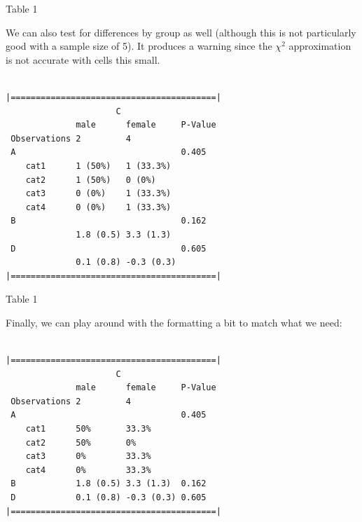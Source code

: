 \begin{frame}[fragile]{Table 1}

We can also test for differences by group as well (although this is not
particularly good with a sample size of 5). It produces a warning since
the \(\chi^2\) approximation is not accurate with cells this small.

\begin{Shaded}
\begin{Highlighting}[]
        \OperatorTok{~}
       \NormalTok{)}
\end{Highlighting}
\end{Shaded}

\begin{verbatim}

|=========================================|
                      C 
              male      female     P-Value
 Observations 2         4                 
 A                                 0.405  
    cat1      1 (50%)   1 (33.3%)         
    cat2      1 (50%)   0 (0%)            
    cat3      0 (0%)    1 (33.3%)         
    cat4      0 (0%)    1 (33.3%)         
 B                                 0.162  
              1.8 (0.5) 3.3 (1.3)         
 D                                 0.605  
              0.1 (0.8) -0.3 (0.3)        
|=========================================|
\end{verbatim}

\end{frame}

\begin{frame}[fragile]{Table 1}

Finally, we can play around with the formatting a bit to match what we
need:

\begin{Shaded}
\begin{Highlighting}[]
        \OperatorTok{~}
       \NormalTok{,}
        \NormalTok{(}\NormalTok{, }\NormalTok{))}
\end{Highlighting}
\end{Shaded}

\begin{verbatim}

|=========================================|
                      C 
              male      female     P-Value
 Observations 2         4                 
 A                                 0.405  
    cat1      50%       33.3%             
    cat2      50%       0%                
    cat3      0%        33.3%             
    cat4      0%        33.3%             
 B            1.8 (0.5) 3.3 (1.3)  0.162  
 D            0.1 (0.8) -0.3 (0.3) 0.605  
|=========================================|
\end{verbatim}

\end{frame}

